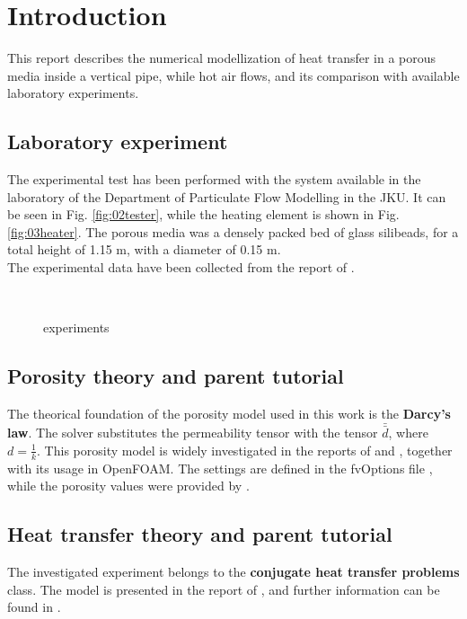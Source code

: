 
\section{Introduction}
\label{section:introduction}

This report describes the numerical modellization of heat transfer in a porous
media inside a vertical pipe, while hot air flows, and its comparison with available laboratory
experiments.

\subsection{Laboratory experiment}
\label{subsection:laboratoryexperiment}

The experimental test has been performed with the system available in the
laboratory of the Department of Particulate Flow Modelling in the JKU.
It can be seen in Fig. \ref{fig:02tester}, while the heating element is shown in
Fig. \ref{fig:03heater}. 
The porous media was a densely packed bed of glass silibeads, for a total height
of 1.15 m, with a diameter of 0.15 m. \\
The experimental data have been collected from the report of
\textcite{ReportHofer}.

\begin{figure}[!h]
\centering
{} \quad  %
{} \\  
\caption[experiments]{experiments}
\label{fig:experiments}
\end{figure}

\subsection{Porosity theory and parent tutorial}
\label{subsection:porositytheorytutorial}

The theorical foundation of the porosity model used in this work is the
\textbf{Darcy's law}.
The solver substitutes the permeability tensor with the tensor $\bar{\bar{d}}$,
where $d= \frac {1}{k}$.
This porosity model is widely investigated in the reports of
\textcite{ReportReveillon} and \textcite{Soulaine}, together with its usage in
OpenFOAM\textregistered.
The settings are defined in the fvOptions file \cite{OForgFv},
while the porosity values were provided by \textcite{Permeability}.


\subsection{Heat transfer theory and parent tutorial}
\label{subsection:heattransfertheorytutorial}

The investigated experiment belongs to the \textbf{conjugate heat transfer
problems} class.
The model is presented in the report of \textcite{ReportTempel},
and further information can be found in \textcite{OFWikicht}.
